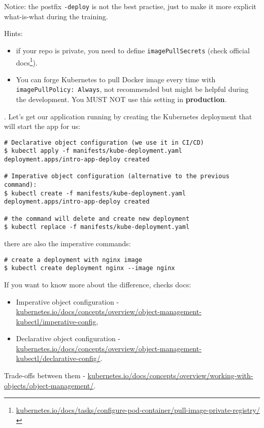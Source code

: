 \documentclass[12pt, letterpaper]{article}
\begin{document}
\smallskip
Notice: the postfix \verb|-deploy| is not the best practise, just to make it more explicit what-is-what during the training.

\smallskip
Hints:
\begin{itemize}
\item if your repo is private, you need to define \verb|imagePullSecrets| (check official docs\footnote{\href{https://kubernetes.io/docs/tasks/configure-pod-container/pull-image-private-registry/}{kubernetes.io/docs/tasks/configure-pod-container/pull-image-private-registry/}}).
\item You can forge Kubernetes to pull Docker image every time with\\ \verb|imagePullPolicy: Always|, not recommended but might be helpful during the development. You MUST NOT use this setting in \textbf{production}.
\end{itemize}

. Let's get our application running by creating the Kubernetes deployment that will start the app for us:

\begin{verbatim}
# Declarative object configuration (we use it in CI/CD)
$ kubectl apply -f manifests/kube-deployment.yaml
deployment.apps/intro-app-deploy created

# Imperative object configuration (alternative to the previous command):
$ kubectl create -f manifests/kube-deployment.yaml
deployment.apps/intro-app-deploy created

# the command will delete and create new deployment
$ kubectl replace -f manifests/kube-deployment.yaml
\end{verbatim}

there are also the imperative commands:

\begin{verbatim}
# create a deployment with nginx image
$ kubectl create deployment nginx --image nginx
\end{verbatim}

If you want to know more about the difference, checks docs:\begin{itemize}
\item Imperative object configuration -\\ \href{https://kubernetes.io/docs/concepts/overview/object-management-kubectl/imperative-config/}{kubernetes.io/docs/concepts/overview/object-management-kubectl/imperative-config},
\item Declarative object configuration -\\ \href{https://kubernetes.io/docs/concepts/overview/object-management-kubectl/declarative-config/}{kubernetes.io/docs/concepts/overview/object-management-kubectl/declarative-config/}.
\end{itemize}
Trade-offs between them - \href{https://kubernetes.io/docs/concepts/overview/working-with-objects/object-management/}{kubernetes.io/docs/concepts/overview/working-with-objects/object-management/}.
\end{document}
